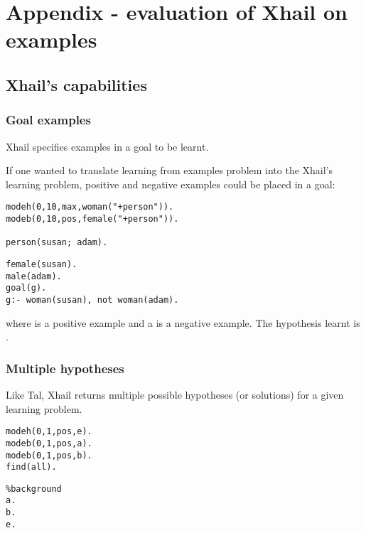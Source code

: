 \chapter{Appendix - evaluation of Xhail on examples}\label{appendix_xhail}
\section{Xhail's capabilities}

\subsection{Goal examples}
Xhail specifies examples in a goal to be learnt.

If one wanted to translate learning from examples problem into the Xhail's learning problem, positive and negative examples could be placed in a goal:

\begin{minipage}[t]{.50\textwidth}
\begin{lstlisting}
modeh(0,10,max,woman("+person")).
modeb(0,10,pos,female("+person")).

person(susan; adam).
\end{lstlisting}
\end{minipage}
\begin{minipage}[t]{.20\textwidth}
\begin{lstlisting}
female(susan).
male(adam).
goal(g).
g:- woman(susan), not woman(adam).
\end{lstlisting}
\end{minipage}

where  is a positive example and a  is a negative example. The hypothesis learnt is
.

\subsection{Multiple hypotheses}
Like Tal, Xhail returns multiple possible hypotheses (or solutions) for a given learning problem.

\begin{minipage}[t]{.50\textwidth}
\begin{lstlisting}
modeh(0,1,pos,e).
modeb(0,1,pos,a).
modeb(0,1,pos,b).
find(all).
\end{lstlisting}
\end{minipage}
\begin{minipage}[t]{.20\textwidth}
\begin{lstlisting}
%background
a.
b.
e.
\end{lstlisting}
\end{minipage}

